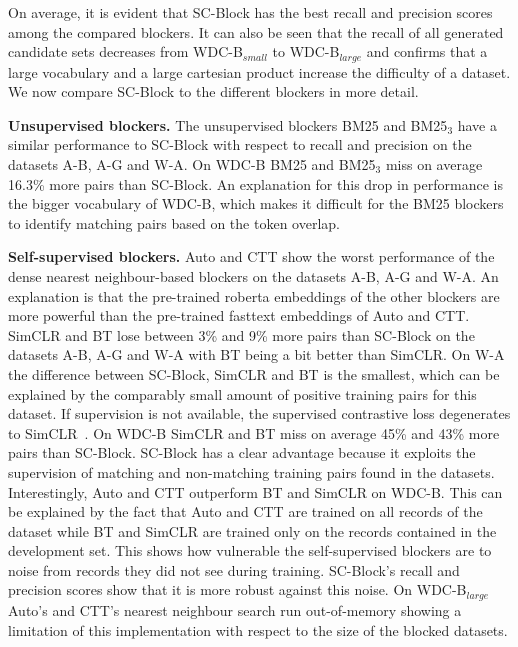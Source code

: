 \documentclass[sigconf,nonacm]{acmart}
\begin{document}
On average, it is evident that SC-Block has the best recall and precision scores among the compared blockers.
It can also be seen that the recall of all generated candidate sets decreases from WDC-B$_{small}$ to WDC-B$_{large}$ and confirms that a large vocabulary and a large cartesian product increase the difficulty of a dataset. 
We now compare SC-Block to the different blockers in more detail.

\vspace{.1cm}\noindent\textbf{Unsupervised blockers.}
The unsupervised blockers BM25 and BM25$_3$ have a similar performance to SC-Block with respect to recall and precision on the datasets A-B, A-G and W-A. On WDC-B BM25 and BM25$_3$ miss on average 16.3\% more pairs than SC-Block. An explanation for this drop in performance is the bigger vocabulary of WDC-B, which makes it difficult for the BM25 blockers to identify matching pairs based on the token overlap. 

\vspace{.1cm}\noindent\textbf{Self-supervised blockers.}
Auto and CTT show the worst performance of the dense nearest neighbour-based blockers on the datasets A-B, A-G and W-A. An explanation is that the pre-trained roberta embeddings of the other blockers are more powerful than the pre-trained fasttext embeddings of Auto and CTT.
SimCLR and BT lose between 3\% and 9\% more pairs than SC-Block on the datasets A-B, A-G and W-A with BT being a bit better than SimCLR.
On W-A the difference between SC-Block, SimCLR and BT is the smallest, which can be explained by the comparably small amount of positive training pairs for this dataset. If supervision is not available, the supervised contrastive loss degenerates to SimCLR~\cite{khosla_supervised_2020}.
On WDC-B SimCLR and BT miss on average 45\% and 43\% more pairs than SC-Block.
SC-Block has a clear advantage because it exploits the supervision of matching and non-matching training pairs found in the datasets.
Interestingly, Auto and CTT outperform BT and SimCLR on WDC-B. This can be explained by the fact that Auto and CTT are trained on all records of the dataset while BT and SimCLR are trained only on the records contained in the development set. This shows how vulnerable the self-supervised blockers are to noise from records they did not see during training. SC-Block's recall and precision scores show that it is more robust against this noise. On WDC-B$_{large}$ Auto's and CTT's nearest neighbour search run out-of-memory showing a limitation of this implementation with respect to the size of the blocked datasets.
\end{document}
